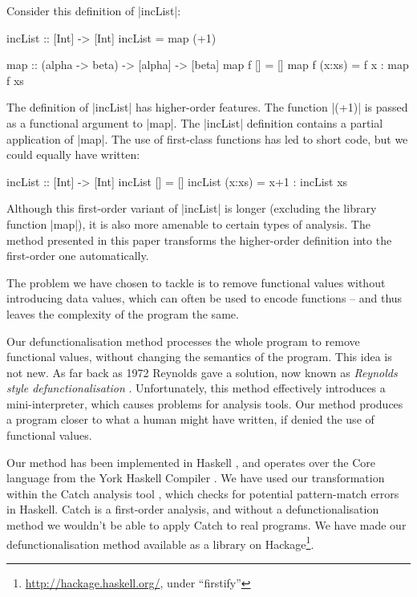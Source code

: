 \documentclass[preprint]{sigplanconf}
\begin{document}
\begin{example}
\label{ex:incList}

Consider this definition of |incList|:

\begin{code}
incList :: [Int] -> [Int]
incList = map (+1)

map :: (alpha -> beta) -> [alpha] -> [beta]
map f []      = []
map f (x:xs)  = f x : map f xs
\end{code}

The definition of |incList| has higher-order features. The function |(+1)| is passed as a functional argument to |map|. The |incList| definition contains a partial application of |map|. The use of first-class functions has led to short code, but we could equally have written:

\begin{code}
incList :: [Int] -> [Int]
incList []      = []
incList (x:xs)  = x+1 : incList xs
\end{code}

Although this first-order variant of |incList| is longer (excluding the library function |map|), it is also more amenable to certain types of analysis. The method presented in this paper transforms the higher-order definition into the first-order one automatically.
\end{example}

The problem we have chosen to tackle is to remove functional values without introducing data values, which can often be used to encode functions -- and thus leaves the complexity of the program the same.

Our defunctionalisation method processes the whole program to remove functional values, without changing the semantics of the program. This idea is not new. As far back as 1972 Reynolds gave a solution, now known as \textit{Reynolds style defunctionalisation} \cite{reynolds:defunc}. Unfortunately, this method effectively introduces a mini-interpreter, which causes problems for analysis tools. Our method produces a program closer to what a human might have written, if denied the use of functional values.

Our method has been implemented in Haskell \cite{haskell}, and operates over the Core language from the York Haskell Compiler \cite{me:yhc_core}. We have used our transformation within the Catch analysis tool \cite{me:catch}, which checks for potential pattern-match errors in Haskell. Catch is a first-order analysis, and without a defunctionalisation method we wouldn't be able to apply Catch to real programs. We have made our defunctionalisation method available as a library on Hackage\footnote{\url{http://hackage.haskell.org/}, under ``firstify''}.
\end{document}
